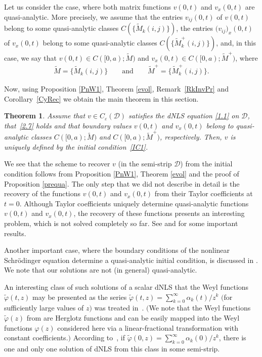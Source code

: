 \documentclass[pdftex]{sigma}
\newtheorem{Theorem}{Theorem}[section]
\def\a{\alpha}
\def\vp{\varphi}
\def\ve{\varepsilon}
\def\wt{\widetilde}
\newcommand{\cD}{{\mathcal D}}
\numberwithin{equation}{section}
\begin{document}
Let us consider the case, where both matrix functions $v(0,t)$ and $v_x(0,t)$ are quasi-analytic.
More precisely, we assume that the entries $v_{ij}(0,t)$ of $v(0,t)$ belong to some quasi-analytic classes $C(\{\wt M_k(i,j)\}) $,
the entries $ \big(v_{ij}\big)_x(0,t) $ of $ v_x(0,t) $ belong to some quasi-analytic classes $C(\{\wt M_k^{+}(i,j)\})$, and, in this case,
we say that $v(0,t) \in C([0,a); \wt M)$ and $v_x(0,t) \in C([0,a); \wt M^+)$, where
\begin{gather*}
\wt M=\{\wt M_k(i,j)\} \qquad {\mathrm{and}} \qquad \wt M^+=\{\wt M^+_k(i,j)\}.
\end{gather*}

Now, using Proposition \ref{PnW1}, Theorem \ref{evol}, Remark~\ref{RkInvPr} and Corollary~\ref{CyRec} we obtain the main theorem
in this section.
\begin{Theorem} Assume that $v\in C_{\ve}(\cD)$ satisfies the dNLS equation \eqref{1.1} on $\cD$, that~\eqref{2.7} holds
 and that boundary values $v(0,t)$ and $v_x(0,t)$ belong to quasi-analytic classes $ C([0,a); \wt M)$ and $C([0,a); \wt M^+)$,
 respectively. Then, $v$ is uniquely defined by the initial condition~\eqref{IC1}.
\end{Theorem}

\begin{Remark}\label{Rec} We see that the scheme to recover $v$ (in the semi-strip $\cD$) from the initial condition
follows from Proposition \ref{PnW1}, Theorem \ref{evol} and the proof of Proposition \ref{prequa}.
The only step that we did not describe in detail is the recovery of the functions $v(0,t)$ and $v_x(0,t)$ from their Taylor coef\/f\/icients
at $t=0$.
Although Taylor coef\/f\/icients uniquely determine quasi-analytic functions $v(0,t)$ and $v_x(0,t)$,
the recovery of these functions presents an interesting problem, which is not solved completely so far.
See \cite{Bang, Khr} and \cite[Section~III.8]{Beur} for some important results.
\end{Remark}

Another important case, where the boundary conditions of the nonlinear Schr\"odinger equation determine a quasi-analytic initial condition, is
discussed in \cite[Section~3]{Sa14b}. We note that
 our solutions are not (in general) quasi-analytic.
\begin{Remark} An interesting class of such solutions of a scalar dNLS that the Weyl functions
$\wt \vp(t,z)$ may be presented as the series $\wt \vp(t,z)=\sum\limits_{k=0}^{\infty}\a_k(t)/z^k$ $($for suf\/f\/iciently large values of
$z)$ was treated in~\cite{SaL91}. $($We note that the Weyl functions $\wt \vp(z)$ from \cite{SaL91}
are Herglotz functions and can be easily mapped into the Weyl functions $\vp(z)$ considered here via a linear-fractional transformation
with constant coef\/f\/icients.$)$ According to~\cite[Theorem~1]{SaL91}, if $\wt \vp(0,z)=\sum\limits_{k=0}^{\infty}\a_k(0)/z^k$, there is one and
only one solution of dNLS from this class in some semi-strip.
\end{Remark}
\end{document}
